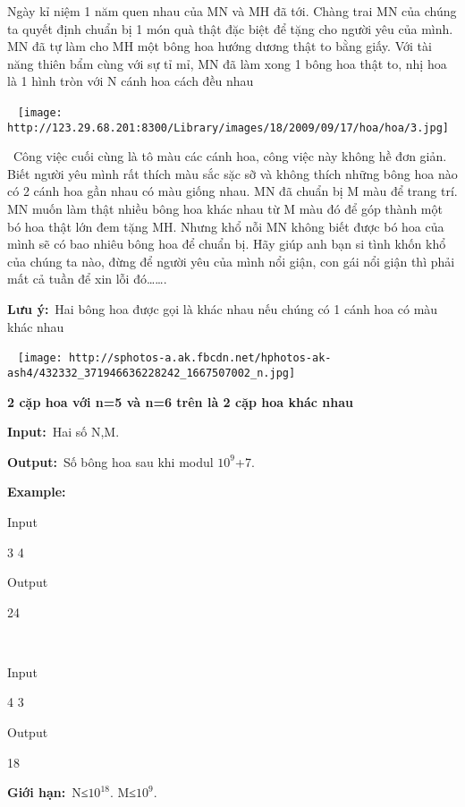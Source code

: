 

Ngày kỉ niệm 1 năm quen nhau của MN và MH đã tới. Chàng trai MN của chúng ta quyết định chuẩn bị 1 món quà thật đặc biệt để tặng cho người yêu của mình. MN đã tự làm cho MH một bông hoa hướng dương thật to bằng giấy. Với tài năng thiên bẩm cùng với sự tỉ mỉ, MN đã làm xong 1 bông hoa thật to, nhị hoa là 1 hình tròn với N cánh hoa cách đều nhau 

 
\texttt{[image: http://123.29.68.201:8300/Library/images/18/2009/09/17/hoa/hoa/3.jpg]}

 Công việc cuối cùng là tô màu các cánh hoa, công việc này không hề đơn giản. Biết người yêu mình rất thích màu sắc sặc sỡ và không thích những bông hoa nào có 2 cánh hoa gần nhau có màu giống nhau. MN đã chuẩn bị M màu để trang trí. MN muốn làm thật nhiều bông hoa khác nhau từ M màu đó để góp thành một bó hoa thật lớn đem tặng MH. Nhưng khổ nỗi MN không biết được bó hoa của mình sẽ có bao nhiêu bông hoa để chuẩn bị. Hãy giúp anh bạn si tình khốn khổ của chúng ta nào, đừng để người yêu của mình nổi giận, con gái nổi giận thì phải mất cả tuần để xin lỗi đó…….

\textbf{Lưu ý:} Hai bông hoa được gọi là khác nhau nếu chúng có 1 cánh hoa có màu khác nhau

 
\texttt{[image: http://sphotos-a.ak.fbcdn.net/hphotos-ak-ash4/432332\_371946636228242\_1667507002\_n.jpg]}

\textbf{2 cặp hoa với n=5 và n=6 trên là 2 cặp hoa khác nhau}

\textbf{Input:} Hai số N,M.

\textbf{Output:} Số bông hoa sau khi modul $10^{9}$+7.

\textbf{Example:}

Input

3 4

Output

24

 

Input

4 3

Output

18

\textbf{Giới hạn:} N≤$10^{18}$. M≤$10^{9}$.
